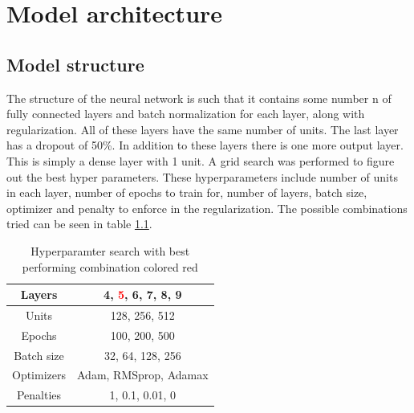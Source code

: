 
\chapter{Model architecture} %

\label{Chapter3} %


\section{Model structure}
The structure of the neural network is such that it contains some number n of  fully connected layers and batch normalization for each layer, along with regularization. All of these layers have the same number of units. The last layer has a dropout of 50\%. In addition to these layers there is one more output layer. This is simply a dense layer with 1 unit. A grid search was performed to figure out the best hyper parameters. These hyperparameters include number of units in each layer, number of epochs to train for, number of layers, batch size, optimizer and penalty to enforce in the regularization. The possible combinations tried can be seen in table \ref{table:gridSearchHyperparamters}.

\begin{table}[h]
    \centering
    \begin{tabular}{c|c}
        Layers &  4, \textcolor{red}{5}, 6, 7, 8, 9\\\hline
        Units &  128, 256, 512\\\hline
        Epochs & 100, 200, 500\\\hline
        Batch size & 32, 64, 128, 256\\\hline
        Optimizers & Adam, RMSprop, Adamax\\\hline
        Penalties & 1, 0.1, 0.01, 0\\\hline
    \end{tabular}
    \caption{Hyperparamter search with best performing combination colored red}
    \label{table:gridSearchHyperparamters}
\end{table}


